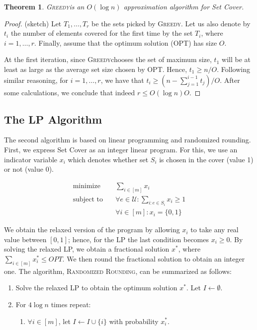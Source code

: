 \documentclass[10pt,a4paper]{article}
\newtheorem{thm}{Theorem}[section]
\newcommand{\mU}{\mathcal{U}}
\newcommand{\greedy}{\textsc{Greedy}}
\begin{document}
\begin{thm}
\greedy is an $O(\log n)$ approximation algorithm for Set Cover.
\end{thm}

\begin{proof}
(sketch) Let $T_1, \dots, T_r$ be the sets picked by \greedy. Let us also denote by $t_i$ the number of elements covered for the first time by the set $T_i$, where $i=1, \dots, r$. Finally, assume that the optimum solution (OPT) has size $O$.

At the first iteration, since \greedy chooses the set of maximum size, $t_1$ will be at least as large as the average set size chosen by OPT.  Hence, $t_1 \geq n/O$. Following similar reasoning, for $i=1, \dots, r$, we have that $t_i \geq (n-\sum_{j=1}^{i-1} t_j) /O$. After some calculations, we conclude that indeed $r \leq O(\log n) O$.
\end{proof}

\subsection{The LP Algorithm}

The second algorithm is based on linear programming and randomized rounding. First, we express Set Cover as an integer linear program. For this, we use an indicator variable $x_i$ which denotes whether set $S_i$ is chosen in the cover (value 1) or not (value 0). 

\begin{align*}
\text{minimize} \quad &  \sum_{i \in [m]} x_i \\
\text{subject to} \quad & \forall e \in \mU : \sum_{i: e \in S_i} x_i \geq 1 \\
& \forall i \in [m]: x_i  = \{0,1\}
\end{align*}

We obtain the relaxed version of the program by allowing $x_i$ to take any real value between $[0,1]$; hence, for the LP the last condition becomes $x_i \geq 0$. By solving the relaxed LP, we obtain a fractional solution $x^{*}$, where $\sum_{i \in [m]} x^{*}_i \leq OPT$. We then round the fractional solution to obtain an integer one. The algorithm, \textsc{Randomized Rounding}, can be summarized as follows:

\begin{enumerate}
\item Solve the relaxed LP to obtain the optimum solution $x^*$. Let $I \leftarrow \emptyset$.
\item For $4 \log n$ times repeat:
\begin{enumerate}
\item $\forall i \in [m]$, let $I \leftarrow I \cup \{i\}$ with probability $x_i^*$.
\end{enumerate}
\end{enumerate}
\end{document}
